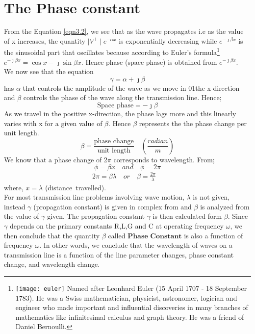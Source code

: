 \section{The Phase constant}
From the Equation \ref{eqn3.2}, we see that as the wave propagates i.e as the value of x increases, the quantity $\mid V^+\mid e^{-\alpha x}$ is exponentially decreasing while $e^{-\jmath\beta x}$ is the sinusoidal part that oscillates because according to Euler's formula\footnote{
\texttt{[image: euler]}
	Named after Leonhard Euler (15 April 1707 - 18 September 1783). He was a Swiss mathematician, physicist, astronomer, logician and engineer who made important and influential discoveries in many branches of mathematics like infinitesimal calculus and graph theory. He was a friend of Daniel Bernoulli.
		} 
$e^{-\jmath\beta x} = \cos{x} - \jmath \sin{ \beta x}$. Hence phase (space phase) is obtained from $e^{-\jmath\beta x}$.\\

We now see that the equation 
\begin{equation}
\gamma = \alpha + \jmath\beta 
\end{equation}
has $\alpha$ that controls the amplitude of the wave as we move in 01the x-direction and $\beta$ controls the phase of the wave along the transmission line. Hence;
\begin{equation}
\text{Space phase} = -\jmath\beta
\end{equation}
As we travel in the positive x-direction, the phase lags more and this linearly varies with x for a given value of $\beta$. Hence $\beta$ represents the the phase change per unit length.
\begin{equation}
\beta = \frac{\text{phase change}}{\text{unit length}} \quad\left(\frac{radian}{m}\right)
\end{equation}
We know that a phase change of 2$\pi$ corresponds to wavelength. From;
\begin{equation}
\phi = \beta x \quad and  \quad\phi = 2\pi
\end{equation}
\begin{align*}
2\pi = \beta\lambda \quad or \quad\beta = \frac{2\pi}{\lambda} \quad
\end{align*}
where, $ x = \lambda $ (distance\ travelled).\\

For most transmission line problems involving wave motion, $\lambda$ is not given, instead $\gamma$ (propagation constant) is given in complex from and $\beta$ is analyzed from the value of $\gamma$ given. The propagation constant $\gamma$ is then calculated form $\beta$.
Since $\gamma$ depends on the primary constants R,L,G and C at operating frequency $\omega$, we then conclude that the quantity $\beta$ called $\textbf{Phase Constant}$ is also a function of frequency $\omega$. In other words, we conclude that the wavelength of waves on a transmission line is a function of the line parameter changes, phase constant change, and wavelength change.
